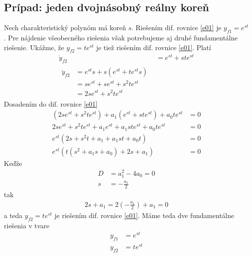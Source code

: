 \documentclass[a4paper, 10pt, ]{article}
\begin{document}
\subsection{Prípad: jeden dvojnásobný reálny koreň}

Nech charakteristický polynóm má koreň $s$. Riešením dif. rovnice \eqref{e01} je $y_{f1} = e^{st}$. Pre nájdenie všeobecného riešenia však potrebujeme aj druhé fundamentálne riešenie. Ukážme, že $y_{f2} = t e^{st}$ je tiež riešením dif. rovnice \eqref{e01}. Platí
\begin{subequations}
    \begin{align}
        \dot y_{f2} &= e^{st} + s t e^{st} \\
        \begin{split}
            \ddot y_{f2} &=  e^{st} s + s \left( e^{st} +  t e^{st} s \right) \\
            &= s e^{st} + s e^{st} + s^2 t e^{st} \\
            &= 2 s e^{st} + s^2 t e^{st}
        \end{split}
    \end{align}
\end{subequations}
Dosadením do dif. rovnice \eqref{e01}
\begin{subequations}
    \begin{align}
        \left( 2 s e^{st} + s^2 t e^{st} \right) + a_1 \left( e^{st} + s t e^{st} \right) + a_0 t e^{st} &= 0 \\
        2 s e^{st} + s^2 t e^{st} + a_1 e^{st} + a_1 s t e^{st} + a_0 t e^{st} &= 0 \\
        e^{st} \left( 2 s + s^2 t + a_1 + a_1 s t + a_0 t \right) &= 0 \\
        e^{st} \left(  t \left( s^2 + a_1s + a_0 \right) + 2s + a_1   \right) &= 0
    \end{align}
\end{subequations}
Keďže
\begin{align}
    D &= a_1^2 - 4 a_0 = 0 \\
    s &= -\frac{a_1}{2}
\end{align}
tak
\begin{align}
    2s+ a_1 = 2 \left( -\frac{a_1}{2} \right) + a_1 = 0
\end{align}
a teda $y_{f2} = t e^{st}$ je riešením dif. rovnice \eqref{e01}.
Máme teda dve fundamentálne riešenia v tvare
\begin{subequations}
    \begin{align}
        y_{f1} &= e^{st} \\
        y_{f2} &= t e^{st}
    \end{align}
\end{subequations}
\end{document}
